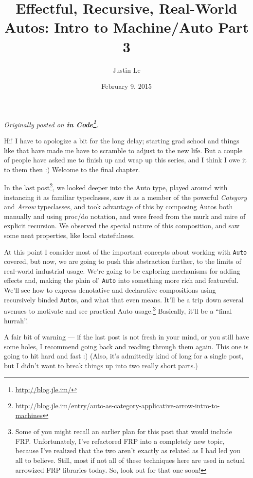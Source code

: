 \documentclass[]{article}
\title{Effectful, Recursive, Real-World Autos: Intro to Machine/Auto Part 3}
\author{Justin Le}
\date{February 9, 2015}
\renewcommand{\href}[2]{#2\footnote{\url{#1}}}
\begin{document}
\maketitle

\emph{Originally posted on \textbf{\href{http://blog.jle.im/}{in
Code}}.}

Hi! I have to apologize a bit for the long delay; starting grad school
and things like that have made me have to scramble to adjust to the new
life. But a couple of people have asked me to finish up and wrap up this
series, and I think I owe it to them then :) Welcome to the final
chapter.

In the
\href{http://blog.jle.im/entry/auto-as-category-applicative-arrow-intro-to-machines}{last
post}, we looked deeper into the Auto type, played around with
instancing it as familiar typeclasses, saw it as a member of the
powerful \emph{Category} and \emph{Arrow} typeclasses, and took
advantage of this by composing Autos both manually and using proc/do
notation, and were freed from the murk and mire of explicit recursion.
We observed the special nature of this composition, and saw some neat
properties, like local statefulness.

At this point I consider most of the important concepts about working
with \texttt{Auto} covered, but now, we are going to push this
abstraction further, to the limits of real-world industrial usage. We're
going to be exploring mechanisms for adding effects and, making the
plain ol' \texttt{Auto} into something more rich and featureful. We'll
see how to express denotative and declarative compositions using
recursively binded \texttt{Auto}s, and what that even means. It'll be a
trip down several avenues to motivate and see practical Auto
usage.\footnote{Some of you might recall an earlier plan for this post
  that would include FRP. Unfortunately, I've refactored FRP into a
  completely new topic, because I've realized that the two aren't
  exactly as related as I had led you all to believe. Still, most if not
  all of these techniques here are used in actual arrowized FRP
  libraries today. So, look out for that one soon!} Basically, it'll be
a ``final hurrah''.

A fair bit of warning --- if the last post is not fresh in your mind, or
you still have some holes, I recommend going back and reading through
them again. This one is going to hit hard and fast :) (Also, it's
admittedly kind of long for a single post, but I didn't want to break
things up into two really short parts.)
\end{document}
